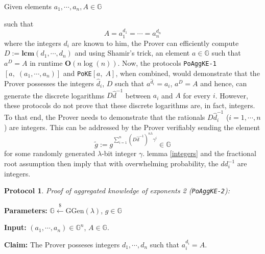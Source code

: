 \documentclass[11pt, lettersize, notitlepage, leqno, footskip=0.6cm]{article}
\newcommand{\slim}{\sum\limits}
\newcommand{\bG}{\mathbb{G}}
\newcommand{\wti}{\widetilde}
\newcommand{\mb}{\mathbb}
\newcommand{\mbf}{\mathbf}
\newcommand{\mr}{\mathrm}
\newcommand{\lam}{\lambda}
\newcommand{\lamb}{\lambda}
\newcommand{\what}{\widehat}
\newcommand{\vs}{\vspace{-0.15cm}}
\newcommand{\LCM}{\mbf{lcm}}
\newtheorem{Prot}[Thm]{Protocol}
\numberwithin{equation}{section}
\begin{document}
\hypertarget{AggKE-2}{Given elements $a_1,\cdots,a_n, A\in\bG$} such that \vs $$A = a_1^{d_1} =\cdots = a_n^{d_n} $$ where the integers $d_i$ are known to him, the Prover can efficiently compute $D:= \LCM(d_1,\cdots,d_n)$ and  using Shamir's trick, an element $a\in\mb{G}$ such that $a^D = A$ in runtime $\mbf{O}(n\log(n))$. Now, the protocols \verb|PoAggKE-1|$[a,\;(a_1,\cdots,a_n)]$ and \verb|PoKE|$[a,\;A]$, when combined, would demonstrate that the Prover possesses the integers $\what{d}_i$, $D$ such that $a^{\what{d}_i} = a_i$, $a^D = A$ and hence, can generate the discrete logarithms $D\what{d}^{-1}$ between $a_i$ and $A$ for every $i$. However, these protocols do not prove that these discrete logarithms are, in fact, integers. To that end, the Prover needs to demonstrate that the rationals $D\what{d}_i^{-1}$ ($i=1,\cdots, n$) are integers. This can be addressed by the Prover verifiably sending the element \vs $$\wti{g} := g^{\slim_{i=1}^{n} (D\what{d}^{-1})^{n\lam}\gamma^i}\in\bG $$ for some randomly generated $\lam$-bit integer $\gamma$. lemma \ref{integers} and the fractional root assumption then imply that with overwhelming probability, the $dd_i^{-1}$ are integers.

 

\vspace{0.2cm}  

\begin{Prot}\normalfont \textit{Proof of aggregated knowledge of exponents} 2 (\verb|PoAggKE-2|): \end{Prot}\vspace{-0.3cm}

\noindent \textbf{Parameters:} $\mb{G}\xleftarrow{\$} \mr{GGen}(\lamb)$,\; $g\in \mb{G}$ 

\noindent \textbf{Input:} $(a_1,\cdots,a_n) \in \mb{G}^n$, $A\in\mb{G}$.

\noindent \textbf{Claim:} The Prover posseses integers $d_1,\cdots,d_n$ such that $a_i^{d_i} = A$. \vs
\end{document}
